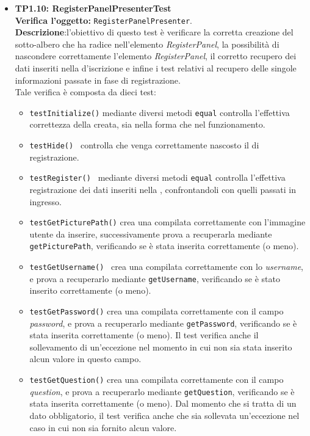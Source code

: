 \begin{itemize}
\item \textbf{TP1.10: RegisterPanelPresenterTest}\\
\textbf{Verifica l'oggetto:} \texttt{RegisterPanelPresenter}.\\
\textbf{Descrizione}:l'obiettivo di questo test è verificare la corretta creazione del sotto-albero che ha radice nell'elemento \textit{RegisterPanel}, la possibilità di nascondere correttamente l'elemento \textit{RegisterPanel}, il corretto recupero dei dati inseriti nella  d'iscrizione e infine i test relativi al recupero delle singole informazioni passate in fase di registrazione.\\
Tale verifica è composta da dieci test:
\begin{itemize}
\item \texttt{testInitialize()} mediante diversi metodi \texttt{equal} controlla l'effettiva correttezza della  creata, sia nella forma che nel funzionamento.
\item \texttt{testHide() } controlla che venga correttamente nascosto il  di registrazione.
\item \texttt{testRegister() } mediante diversi metodi \texttt{equal} controlla l'effettiva registrazione dei dati inseriti nella , confrontandoli con quelli passati in ingresso.
\item \texttt{testGetPicturePath()} crea una  compilata correttamente con l'immagine utente da inserire, successivamente prova a recuperarla mediante \texttt{getPicturePath}, verificando se è stata inserita correttamente (o meno).
\item \texttt{testGetUsername() } crea una  compilata correttamente con lo \textit{username}, e prova a recuperarlo mediante \texttt{getUsername}, verificando se è stato inserito correttamente (o meno).
\item \texttt{testGetPassword()} crea una  compilata correttamente con il campo \textit{password}, e prova a recuperarlo mediante \texttt{getPassword}, verificando se è stata inserita correttamente (o meno). Il test verifica anche il sollevamento di un'eccezione nel momento in cui non sia stata inserito alcun valore in questo campo.
\item \texttt{testGetQuestion()}  crea una  compilata correttamente con il campo \textit{question}, e prova a recuperarlo mediante \texttt{getQuestion}, verificando se è stata inserita correttamente (o meno). Dal momento che si tratta di un dato obbligatorio, il test verifica anche che sia sollevata un'eccezione nel caso in cui non sia fornito alcun valore.

\end{itemize}
\end{itemize}
